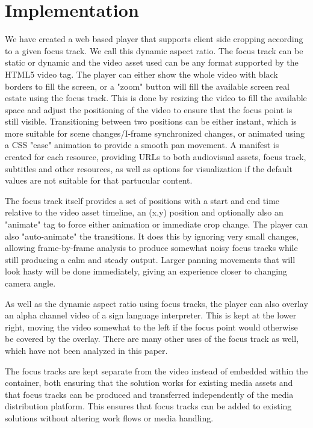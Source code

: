 \documentclass[sigconf, review=false]{acmart}
\begin{document}
\section{Implementation}

We have created a web based player that supports client side cropping
according to a given focus track. We call this dynamic aspect ratio. The
focus track can be static or dynamic and the video asset used can be any
format supported by the HTML5 video tag. The player can either show the whole
video with black borders to fill the screen, or a "zoom" button will fill the
available screen real estate using the focus track. This is done by resizing
the video to fill the available space and adjust the positioning of the video
to ensure that the focus point is still visible. Transitioning between two
positions can be either instant, which is more suitable for scene
changes/I-frame synchronized changes, or animated using a CSS "ease"
animation to provide a smooth pan movement. A manifest is created for each
resource, providing URLs to both audiovisual assets, focus track, subtitles
and other resources, as well as options for visualization if the default
values are not suitable for that partucular content.

The focus track itself provides a set of positions with a start and end time
relative to the video asset timeline, an (x,y) position and optionally also
an "animate" tag to force either animation or immediate crop change. The
player can also "auto-animate" the transitions. It does this by ignoring very
small changes, allowing frame-by-frame analysis to produce somewhat noisy
focus tracks while still producing a calm and steady output. Larger panning
movements that will look hasty will be done immediately, giving an experience
closer to changing camera angle.

As well as the dynamic aspect ratio using focus tracks, the player can also
overlay an alpha channel video of a sign language interpreter. This is kept
at the lower right, moving the video somewhat to the left if the focus point
would otherwise be covered by the overlay. There are many other uses of the
focus track as well, which have not been analyzed in this paper.

The focus tracks are kept separate from the video instead of embedded within
the container, both ensuring that the solution works for existing media
assets and that focus tracks can be produced and transferred independently of
the media distribution platform. This ensures that focus tracks can be added
to existing solutions without altering work flows or media handling.
\end{document}
